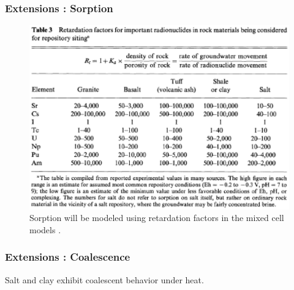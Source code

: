 \begin{frame}[ctb!]
  \frametitle{Extensions : Sorption}
  \begin{figure}[h!]
      \includegraphics[height=.8\textheight]{sorptionKrauskopf.eps}
    \caption{Sorption will be modeled using retardation factors in the mixed 
    cell models \cite{krauskopf_geology_1988}.}
    \label{fig:sorptionKrauskopf}
  \end{figure}
\end{frame}


\begin{frame}[ctb!]
  \frametitle{Extensions : Coalescence}
  Salt and clay exhibit coalescent behavior under heat.
\end{frame}


